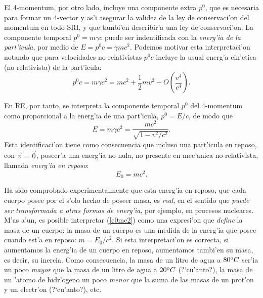 El 4-momentum, por otro lado, incluye una componente extra $p^0$, que es
necesaria para formar un 4-vector y as'i asegurar la validez de la ley de
conservaci'on del momentum en todo SRI, y que tambi'en describir'a una ley de
conservaci'on. La componente temporal $p^0=m\gamma c$ puede ser indentificada
con la\textit{ energ'ia de la part'icula}, por medio de $E=p^0 c=\gamma mc^2$.
Podemos motivar esta interpretaci'on notando que para velocidades
no-relativistas $p^0 c$ incluye la usual energ'a cin'etica (no-relativista) de
la part'icula:
\begin{equation}
p^0c=m\gamma c^2=mc^2+\frac{1}{2}mv^2+O(\frac{v^4}{c^4}).
\end{equation}

En RE, por tanto, se interpreta la componente temporal $p^0$ del 4-momentum como proporcional a la energ'ia de una part'icula, $p^0=E/c$, de modo que
\begin{equation}
 \boxed{E=m\gamma c^2=\frac{mc^2}{\sqrt{1-v^2/c^2}}.} \label{emgc2}
\end{equation}
 Esta identificaci'on tiene como consecuencia que incluso una  part'icula en reposo, con
$\vec{v}=\vec{0}$, poseer'a una energ'ia no nula, no presente en mec'anica
no-relativista, llamada \textit{energ'ia en reposo}:
\begin{equation}
\boxed{E_0=mc^2.} \label{e0mc2}
\end{equation}

Ha sido comprobado experimentalmente que esta energ'ia en reposo, que cada
cuerpo posee por el s'olo hecho de poseer masa, es \textit{real}, en el
sentido que \textit{puede ser transformada a otras formas de energ'ia}, por ejemplo, en procesos nucleares. M'as a'un, es posible interpretar (\ref{e0mc2}) como una expresi'on que \textit{define} la masa de un cuerpo: la masa de un cuerpo es una medida de la energ'ia que posee cuando est'a en reposo: $m=E_0/c^2$. Si esta interpretaci'on es correcta, si aumentamos la energ'ia de un cuerpo en reposo, aumentamos tambi'en su masa, es decir, su inercia. Como consecuencia, la masa de un litro de agua a $80^{\rm o} C$ ser'ia un poco \textit{mayor} que la masa de un litro de agua a $20^{\rm o} C$ (?`cu'anto?), la masa de un 'atomo de hidr'ogeno un poco \textit{menor} que la suma de las masas de un prot'on y un electr'on (?`cu'anto?), etc.

